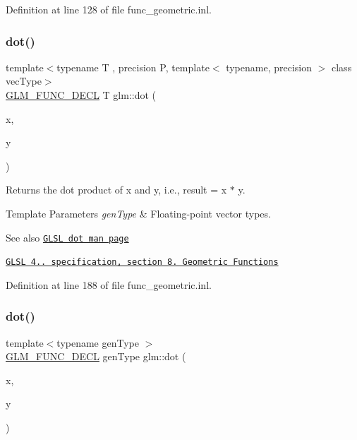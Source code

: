 Definition at line 128 of file func\+\_\+geometric.\+inl.

\mbox{\label{group__core__func__geometric_ga7dada304da2ba7dd3376ab4f178c3f6b}} 
\subsubsection{\texorpdfstring{dot()}{dot()}\hspace{0.1cm}{\footnotesize\ttfamily [1/2]}}
{\footnotesize\ttfamily template$<$typename T , precision P, template$<$ typename, precision $>$ class vec\+Type$>$ \\
\hyperlink{setup_8hpp_ab2d052de21a70539923e9bcbf6e83a51}{G\+L\+M\+\_\+\+F\+U\+N\+C\+\_\+\+D\+E\+CL} T glm\+::dot (\begin{DoxyParamCaption}\item[{vec\+Type$<$ T, P $>$ const \&}]{x,  }\item[{vec\+Type$<$ T, P $>$ const \&}]{y }\end{DoxyParamCaption})}

Returns the dot product of x and y, i.\+e., result = x $\ast$ y.


\begin{DoxyTemplParams}{Template Parameters}
{\em gen\+Type} & Floating-\/point vector types.\\
\hline
\end{DoxyTemplParams}
\begin{DoxySeeAlso}{See also}
\href{http://www.opengl.org/sdk/docs/manglsl/xhtml/dot.xml}{\tt G\+L\+SL dot man page} 

\href{http://www.opengl.org/registry/doc/GLSLangSpec.4.20.8.pdf}{\tt G\+L\+SL 4.. specification, section 8. Geometric Functions} 
\end{DoxySeeAlso}


Definition at line 188 of file func\+\_\+geometric.\+inl.

\mbox{\label{group__core__func__geometric_gaef767c2b0678489cb9de7a534137a86d}} 
\subsubsection{\texorpdfstring{dot()}{dot()}\hspace{0.1cm}{\footnotesize\ttfamily [2/2]}}
{\footnotesize\ttfamily template$<$typename gen\+Type $>$ \\
\hyperlink{setup_8hpp_ab2d052de21a70539923e9bcbf6e83a51}{G\+L\+M\+\_\+\+F\+U\+N\+C\+\_\+\+D\+E\+CL} gen\+Type glm\+::dot (\begin{DoxyParamCaption}\item[{gen\+Type const \&}]{x,  }\item[{gen\+Type const \&}]{y }\end{DoxyParamCaption})}

